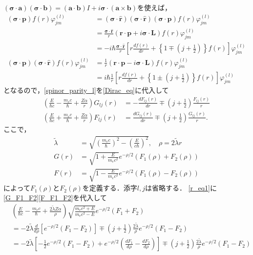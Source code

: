 $(\boldsymbol{\sigma}\cdot\boldsymbol{a})(\boldsymbol{\sigma}\cdot\boldsymbol{b}) = (\boldsymbol{a}\cdot\boldsymbol{b})I + i\boldsymbol{\sigma}\cdot(\boldsymbol{a}\times\boldsymbol{b})$を使えば，
\begin{align*}
  (\boldsymbol{\sigma}\cdot\boldsymbol{p})f(r)\varphi_{jm}^{(l)}
  &=(\boldsymbol{\sigma}\cdot\hat{\boldsymbol{r}})(\boldsymbol{\sigma}\cdot\hat{\boldsymbol{r}})(\boldsymbol{\sigma}\cdot\boldsymbol{p})f(r)\varphi_{jm}^{(l)}\\
  &= \frac{\boldsymbol{\sigma}\cdot\hat{\boldsymbol{r}}}{r}(\boldsymbol{r}\cdot\boldsymbol{p} + i\boldsymbol{\sigma}\cdot\boldsymbol{L})f(r)\varphi_{jm}^{(l)}\\
  &=  - i\hbar\frac{\boldsymbol{\sigma}\cdot\hat{\boldsymbol{r}}}{r}\left[r\frac{df(r)}{dr} + \left\{1\mp\left(j + \frac{1}{2}\right)\right\}f(r)\right]\varphi_{jm}^{(l)}\\
  (\boldsymbol{\sigma}\cdot\boldsymbol{p})(\boldsymbol{\sigma}\cdot\hat{\boldsymbol{r}})f(r)\varphi_{jm}^{(l)}
  &= \frac{1}{r}(\boldsymbol{r}\cdot\boldsymbol{p} - i\boldsymbol{\sigma}\cdot\boldsymbol{L})f(r)\varphi_{jm}^{(l)}\\
  &= i\hbar\frac{1}{r}\left[r\frac{df(r)}{dr} + \left\{1\pm\left(j + \frac{1}{2}\right)\right\}f(r)\right]\varphi_{jm}^{(l)}
\end{align*}
となるので，\eqref{spinor_parity_l}を\eqref{Dirac_eq}に代入して
\begin{align}
  \left(\frac{E}{\hbar c} - \frac{m_ec}{\hbar} + \frac{Z\alpha}{r}\right)G_{lj}(r) &=  - \frac{dF_{lj}(r)}{dr}\mp\left(j + \frac{1}{2}\right)\frac{F_{lj}(r)}{r}\label{r_eq1}\\
  \left(\frac{E}{\hbar c} + \frac{m_ec}{\hbar} + \frac{Z\alpha}{r}\right)F_{lj}(r) &= \frac{dG_{lj}(r)}{dr}\mp\left(j + \frac{1}{2}\right)\frac{G_{lj}(r)}{r}.\label{r_eq2}
\end{align}
ここで，
\begin{align}
  \tilde{\lambda} &= \sqrt{\left(\frac{m_ec}{\hbar}\right)^2 - \left(\frac{E}{c\hbar}\right)^2},\quad\rho=2\tilde{\lambda}r\label{lambda_def}\\
  G(r) &= \sqrt{1 + \frac{E}{m_ec^2}}e^{ - \rho/2}(F_1(\rho) + F_2(\rho))\label{G_F1_F2}\\
  F(r) &= \sqrt{1 - \frac{E}{m_ec^2}}e^{ - \rho/2}(F_1(\rho) - F_2(\rho))\label{F_F1_F2}
\end{align}
によって$F_1(\rho)$と$F_2(\rho)$を定義する．添字$l,j$は省略する．
\eqref{r_eq1}に\eqref{G_F1_F2}\eqref{F_F1_F2}を代入して
\begin{align*}
  &\left(\frac{E}{\hbar c} - \frac{m_ec}{\hbar} + \frac{2\tilde{\lambda}Z\alpha}{\rho}\right)\sqrt{\frac{m_ec^2 + E}{m_ec^2 - E}}e^{ - \rho/2}(F_1 + F_2)\\
  &=  - 2\tilde{\lambda}\frac{d}{d\rho}\left[e^{ - \rho/2}(F_1 - F_2)\right]\mp\left(j + \frac{1}{2}\right)\frac{2\tilde{\lambda}}{\rho}e^{ - \rho/2}(F_1 - F_2)\\
  &=  - 2\tilde{\lambda}\left[ - \frac{1}{2}e^{ - \rho/2}(F_1 - F_2) + e^{ - \rho/2}\left(\frac{dF_1}{d\rho} - \frac{dF_2}{d\rho}\right)\right]\mp\left(j + \frac{1}{2}\right)\frac{2\tilde{\lambda}}{\rho}e^{ - \rho/2}(F_1 - F_2)\\
\end{align*}
